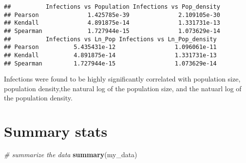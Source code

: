 \documentclass[]{article}
\newenvironment{Shaded}{\begin{snugshade}}{\end{snugshade}}
\newcommand{\CommentTok}[1]{\textcolor[rgb]{0.56,0.35,0.01}{\textit{#1}}}
\newcommand{\DecValTok}[1]{\textcolor[rgb]{0.00,0.00,0.81}{#1}}
\newcommand{\KeywordTok}[1]{\textcolor[rgb]{0.13,0.29,0.53}{\textbf{#1}}}
\newcommand{\NormalTok}[1]{#1}
\newcommand{\OperatorTok}[1]{\textcolor[rgb]{0.81,0.36,0.00}{\textbf{#1}}}
\newcommand{\StringTok}[1]{\textcolor[rgb]{0.31,0.60,0.02}{#1}}
\begin{document}
\begin{Shaded}
\end{Shaded}

\begin{verbatim}
##          Infections vs Population Infections vs Pop_density
## Pearson              1.425785e-39              2.109105e-30
## Kendall              4.891875e-14              1.331731e-13
## Spearman             1.727944e-15              1.073629e-14
##          Infections vs Ln_Pop Infections vs Ln_Pop_density
## Pearson          5.435431e-12                 1.096061e-11
## Kendall          4.891875e-14                 1.331731e-13
## Spearman         1.727944e-15                 1.073629e-14
\end{verbatim}

Infections were found to be highly significantly correlated with
population size, population density,the natural log of the population
size, and the natuarl log of the population density.

\hypertarget{summary-stats}{%
\section{Summary stats}\label{summary-stats}}

\begin{Shaded}
\begin{Highlighting}[]
\CommentTok{# summarize the data}
\KeywordTok{summary}\NormalTok{(my_data)}
\end{Highlighting}
\end{Shaded}
\end{document}
